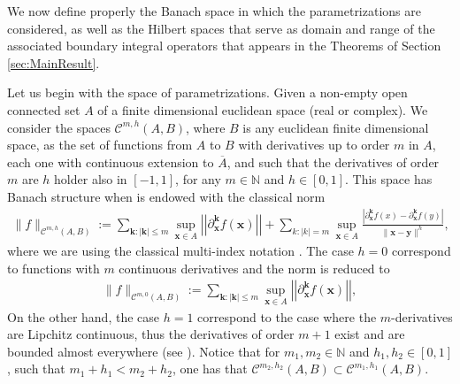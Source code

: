 \documentclass{article}
\newcommand{\IN}{{\mathbb N}}
\newcommand{\cmspaceh}[4]{\mathcal{C}^{#1,#2} \left( #3, #4 \right)}
\newcommand{\bk}{\bm{k}}
\newcommand{\bx}{\bm{x}}
\newcommand{\by}{\bm{y}}
\begin{document}
We now define properly the Banach space in which the parametrizations are considered, as well as the Hilbert spaces that serve as domain and range of the associated boundary integral operators that appears in the Theorems of Section \ref{sec:MainResult}.

Let us begin with the space of parametrizations. Given a non-empty open connected set $A$ of a finite dimensional euclidean space (real or complex). We consider the spaces $\cmspaceh{m}{h}{A}{B}$, where $B$ is any euclidean finite dimensional space, as the set of functions from $A$ to $B$ with derivatives up to order $m$ in $A$, each one with continuous extension to $\overline{A}$, and such that the derivatives of order $m$ are $h$ holder   also in $[-1,1]$, for any $m\in \IN$ and $h \in [0,1]$. This space has Banach structure when is endowed with the classical norm 
\begin{align*}
\| f \|_{\cmspaceh{m}{h}{A}{B}} := \sum_{\bk: |\bk| \leq m } \sup_{\bx \in A}  \left\vert\left\vert\partial_{\bx}^{\bk} f(\bx) \right\vert\right\vert+ \sum_{k: |k| =m} \sup_{\bx \in A}  \frac{|\partial_{\bx}^{\bk}f(x)-\partial_{\bx}^{\bk}f(y)|}{\| \bx - \by\|^h},
\end{align*}
where we are using the classical multi-index notation \cite[pg. 61]{mclean2000strongly}.  The case $h=0$ correspond to functions with $m$ continuous derivatives and the norm is reduced to 
\begin{align*}
\| f \|_{\cmspaceh{m}{0}{A}{B}} := \sum_{\bk: |\bk| \leq m } \sup_{\bx \in A}  \left\vert\left\vert\partial_{\bx}^{\bk} f(\bx) \right\vert\right\vert,
\end{align*}
On the other hand, the case $h=1$ correspond to the case where the $m$-derivatives are Lipchitz continuous, thus the derivatives of order $m+1$ exist and are bounded almost everywhere (see \cite[pg. 280]{evans1998partial}). Notice that for $m_1, m_2 \in \IN$ and $h_1, h_2 \in [0,1]$, such that $m_1 + h_1 < m_2 + h_2$, one has that $\cmspaceh{m_2}{h_2}{A}{B} \subset \cmspaceh{m_1}{h_1}{A}{B}$.
\end{document}
